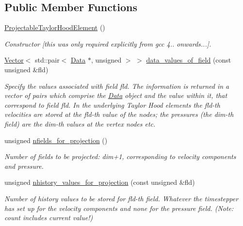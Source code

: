 \subsection*{Public Member Functions}
\begin{DoxyCompactItemize}
\item 
\hyperlink{classoomph_1_1ProjectableTaylorHoodElement_ae87b1286fc74007436210e4114c0c8f1}{Projectable\+Taylor\+Hood\+Element} ()
\begin{DoxyCompactList}\small\item\em Constructor \mbox{[}this was only required explicitly from gcc 4.. onwards...\mbox{]}. \end{DoxyCompactList}\item 
\hyperlink{classoomph_1_1Vector}{Vector}$<$ std\+::pair$<$ \hyperlink{classoomph_1_1Data}{Data} $\ast$, unsigned $>$ $>$ \hyperlink{classoomph_1_1ProjectableTaylorHoodElement_a6def621e7df117d5e803e8e47f53c352}{data\+\_\+values\+\_\+of\+\_\+field} (const unsigned \&fld)
\begin{DoxyCompactList}\small\item\em Specify the values associated with field fld. The information is returned in a vector of pairs which comprise the \hyperlink{classoomph_1_1Data}{Data} object and the value within it, that correspond to field fld. In the underlying Taylor Hood elements the fld-\/th velocities are stored at the fld-\/th value of the nodes; the pressures (the dim-\/th field) are the dim-\/th values at the vertex nodes etc. \end{DoxyCompactList}\item 
unsigned \hyperlink{classoomph_1_1ProjectableTaylorHoodElement_a86f40ce1d2f04cfe2a4b738cdc72a318}{nfields\+\_\+for\+\_\+projection} ()
\begin{DoxyCompactList}\small\item\em Number of fields to be projected\+: dim+1, corresponding to velocity components and pressure. \end{DoxyCompactList}\item 
unsigned \hyperlink{classoomph_1_1ProjectableTaylorHoodElement_a5d64cb39e6ae0e286c08cbb6c84bcaeb}{nhistory\+\_\+values\+\_\+for\+\_\+projection} (const unsigned \&fld)
\begin{DoxyCompactList}\small\item\em Number of history values to be stored for fld-\/th field. Whatever the timestepper has set up for the velocity components and none for the pressure field. (Note\+: count includes current value!) \end{DoxyCompactList}\item 

\end{DoxyCompactItemize}
